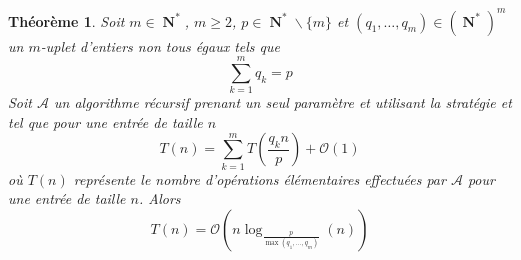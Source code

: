 \documentclass[a4paper,12pt,reqno]{amsart}
\newtheorem{prevtheorem}{Théorème}
\theoremstyle{remark}
\numberwithin{equation}{section}
\DeclareMathOperator{\N}{\mathbf{N}}
\renewcommand{\geq}{\geqslant}
\begin{document}
\begin{prevtheorem}\label{Thm:A}
	Soit $m\in\N^*$, $m\geq 2$, $p\in \N^*\backslash\lbrace m\rbrace$ et $(q_1,\dots,q_m)\in(\N^*)^m$ un $m$-uplet d'entiers non tous égaux tels que \[\sum_{k=1}^mq_k=p\]
	Soit $\mathcal A$ un algorithme récursif prenant un seul paramètre et utilisant la stratégie  et tel que pour une entrée de taille $n$ \[T(n)=\sum_{k=1}^mT\left(\frac{q_kn}p\right)+\mathcal O(1)\]
	où $T(n)$ représente le nombre d'opérations élémentaires effectuées par $\mathcal A$ pour une entrée de taille $n$. Alors \[T(n)=\mathcal O\left(n\log_{\frac{p}{\max(q_1,\dots,q_m)}}(n)\right)\]
\end{prevtheorem}
\end{document}
